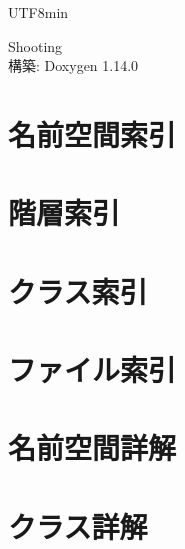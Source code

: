 \documentclass[twoside]{book}
\newcommand{\+}{\discretionary{\mbox{\scriptsize$\hookleftarrow$}}{}{}}
\newcommand{\clearemptydoublepage}{%
    \newpage{\pagestyle{empty}\cleardoublepage}%
  }
\begin{document}
  \raggedbottom
  \begin{CJK}{UTF8}{min}
    \hypersetup{pageanchor=false,
                bookmarksnumbered=true,
                pdfencoding=unicode
               }
  \begin{titlepage}
  \vspace*{7cm}
  \begin{center}%
  {\Large Shooting}\\
  \vspace*{1cm}
  {\large 構築\+: Doxygen 1.14.0}\\
  \end{center}
  \end{titlepage}
  \clearemptydoublepage
  \tableofcontents
  \clearemptydoublepage
  \hypersetup{pageanchor=true}
\chapter{名前空間索引}

\chapter{階層索引}

\chapter{クラス索引}

\chapter{ファイル索引}

\chapter{名前空間詳解}

\chapter{クラス詳解}












\end{CJK}
\end{document}
